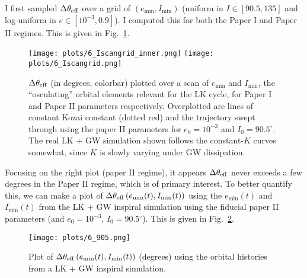 \documentclass[11pt,
        usenames, %
        dvipsnames %
    ]{article}
\newcommand*{\p}[1]{\left(#1\right)}
\begin{document}
I first sampled $\Delta \theta_{\rm eff}$ over a grid of $\p{e_{\min},
I_{\min}}$ (uniform in $I \in [90.5, 135]$ and log-uniform in $e \in [10^{-3},
0.9]$). I computed this for both the Paper I and Paper II regimes. This is given
in Fig.~\ref{fig:scangrid}.

\begin{figure}
    \centering
    \texttt{[image: plots/6\_Iscangrid\_inner.png]}
    \texttt{[image: plots/6\_Iscangrid.png]}
    \caption{$\Delta \theta_{\rm eff}$ (in degrees, colorbar) plotted over a
    scan of $e_{\min}$ and $I_{\min}$, the ``osculating'' orbital elements relevant
    for the LK cycle, for Paper I and Paper II parameters respectively.
    Overplotted are lines of constant Kozai constant (dotted red) and the
    trajectory swept through using the paper II parameters for $e_0 = 10^{-3}$
    and $I_0 = 90.5^\circ$. The real LK + GW simulation shown follows the
    constant-$K$ curves somewhat, since $K$ is slowly varying under GW
    dissipation.}\label{fig:scangrid}
\end{figure}

Focusing on the right plot (paper II regime), it appears $\Delta \theta_{\rm
eff}$ never exceeds a few degrees in the Paper II regime, which is of primary
interest. To better quantify this, we can make a plot of $\Delta \theta_{\rm
eff}\p{e_{\min}(t), I_{\min}(t)}$ using the $e_{\min}(t)$ and $I_{\min}(t)$ from
the LK + GW inspiral simulation using the fiducial paper II parameters (and $e_0
= 10^{-3}$, $I_0 = 90.5^\circ$). This is given in Fig.~\ref{fig:905}.
\begin{figure}
    \centering
    \texttt{[image: plots/6\_905.png]}
    \caption{Plot of $\Delta \theta_{\rm eff}\p{e_{\min}(t),
    I_{\min}(t)}$ (degrees) using the orbital histories from a LK + GW inspiral
    simulation.}\label{fig:905}
\end{figure}
\end{document}
